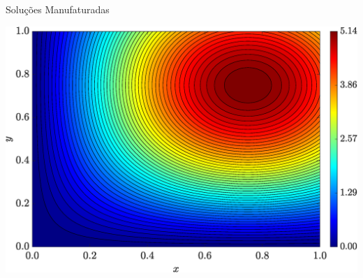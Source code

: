 \begin{frame}{Soluções Manufaturadas}
\begin{minipage}{0.31\textwidth}
        \label{fig_solexaTxyCase11}
    \end{minipage}
    \hfill
    \begin{minipage}{0.31\textwidth}
        \centering
        \includegraphics[width=\textwidth]{Figures/Exact_Map_NormErr_2nd_Betann_0.1_Re_1_Wi_1_epsilon_0_xi_0_alphaG_0_Dt_1e-06_at_0.05_tipsim_1_MMS_12_Tyy.eps}
        \label{fig_solexaTyyCase11}
    \end{minipage}
\end{frame}

